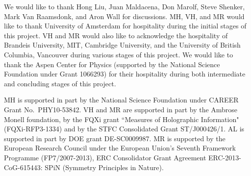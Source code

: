 \documentclass[12pt]{article}
\begin{document}
We would like to thank Hong Liu, Juan Maldacena, Don Marolf, Steve Shenker, Mark Van Raamsdonk,  and Aron Wall for discussions. MH, VH, and MR would like to thank University of Amsterdam for hospitality during the initial stages of this project. VH and MR would also like to acknowledge the hospitality of Brandeis University, MIT, Cambridge University, and the University of British Columbia, Vancouver during various stages of this project.  We would like to thank the Aspen Center for Physics (supported by the National Science Foundation under Grant 1066293) for their hospitality during both intermediate and concluding stages of this project.

MH is supported in part by the National Science Foundation under CAREER Grant No.\ PHY10-53842. VH and MR are supported in part by the Ambrose Monell foundation, by the FQXi  grant ``Measures of Holographic Information" (FQXi-RFP3-1334) and  by the STFC Consolidated Grant ST/J000426/1. AL is supported in part by DOE grant DE-SC0009987.
MR is supported by the European Research Council under the European Union's Seventh Framework Programme (FP7/2007-2013), ERC Consolidator Grant Agreement ERC-2013-CoG-615443: SPiN (Symmetry Principles in Nature).
\end{document}

